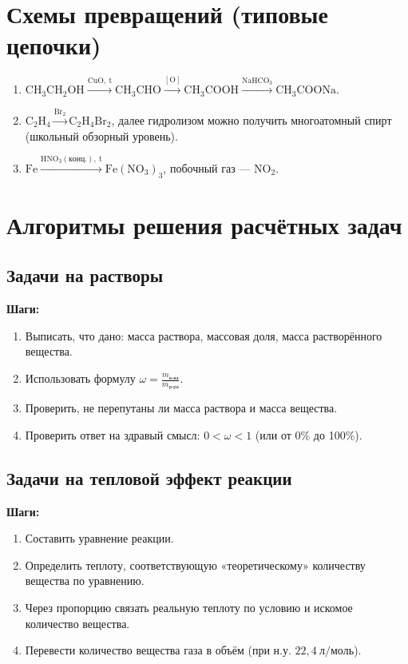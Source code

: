 \documentclass[a4paper,12pt]{article}
\begin{document}
\section{Схемы превращений (типовые цепочки)}
\begin{enumerate}
    \item \(\mathrm{CH_3CH_2OH \xrightarrow{CuO,\ t} CH_3CHO \xrightarrow{[O]} CH_3COOH \xrightarrow{NaHCO_3} CH_3COONa}\).
    \item \(\mathrm{C_2H_4 \xrightarrow{Br_2} C_2H_4Br_2}\), далее гидролизом можно получить многоатомный спирт (школьный обзорный уровень).
    \item \(\mathrm{Fe \xrightarrow{HNO_3(конц.),\ t} Fe(NO_3)_3}\), побочный газ --- \(\mathrm{NO_2}\).
\end{enumerate}

\section{Алгоритмы решения расчётных задач}

\subsection{Задачи на растворы}
\textbf{Шаги:}
\begin{enumerate}
    \item Выписать, что дано: масса раствора, массовая доля, масса растворённого вещества.
    \item Использовать формулу \(\omega = \frac{m_{\text{в-ва}}}{m_{\text{р-ра}}}\).
    \item Проверить, не перепутаны ли масса раствора и масса вещества.
    \item Проверить ответ на здравый смысл: \(0<\omega<1\) (или от 0\% до 100\%).
\end{enumerate}

\subsection{Задачи на тепловой эффект реакции}
\textbf{Шаги:}
\begin{enumerate}
    \item Составить уравнение реакции.
    \item Определить теплоту, соответствующую «теоретическому» количеству вещества по уравнению.
    \item Через пропорцию связать реальную теплоту по условию и искомое количество вещества.
    \item Перевести количество вещества газа в объём (при н.у. \(22{,}4\ \mathrm{л/моль}\)).
\end{enumerate}
\end{document}
